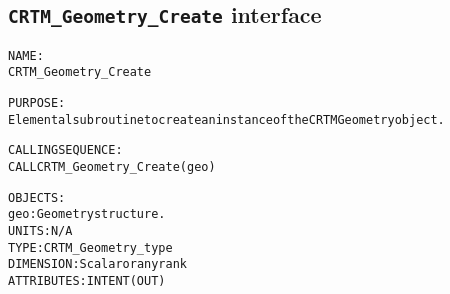\subsection{\texttt{CRTM\_Geometry\_Create} interface}
  \label{sec:CRTM_Geometry_Create_interface}
  \begin{alltt}
 
  NAME:
        CRTM_Geometry_Create
 
  PURPOSE:
        Elemental subroutine to create an instance of the CRTM Geometry object.
 
  CALLING SEQUENCE:
        CALL CRTM_Geometry_Create( geo )
 
  OBJECTS:
        geo:          Geometry structure.
                      UNITS:      N/A
                      TYPE:       CRTM_Geometry_type
                      DIMENSION:  Scalar or any rank
                      ATTRIBUTES: INTENT(OUT)
 
  \end{alltt}
